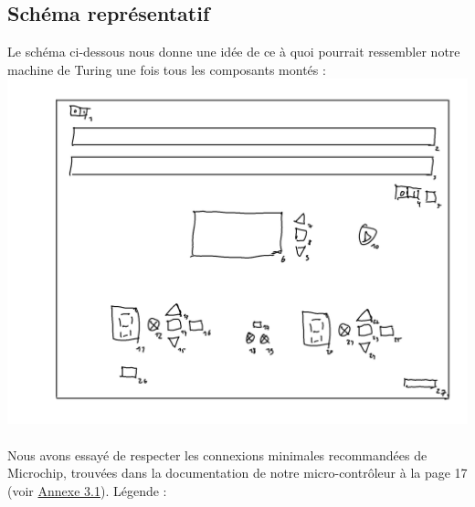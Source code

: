 \documentclass[12pt]{report}
\begin{document}
	\subsection{Schéma représentatif}
	Le schéma ci-dessous nous donne une idée de ce à quoi pourrait ressembler notre machine de Turing une fois tous les composants montés :\\
	\includegraphics[width=\textwidth]{img/rep_machine}
	\\
	\\
	Nous avons essayé de respecter les connexions minimales recommandées de Microchip, trouvées dans la documentation de notre micro-contrôleur à la page 17 (voir \hyperref[sec:an3.1]{Annexe 3.1}).
	Légende :\\
\end{document}
